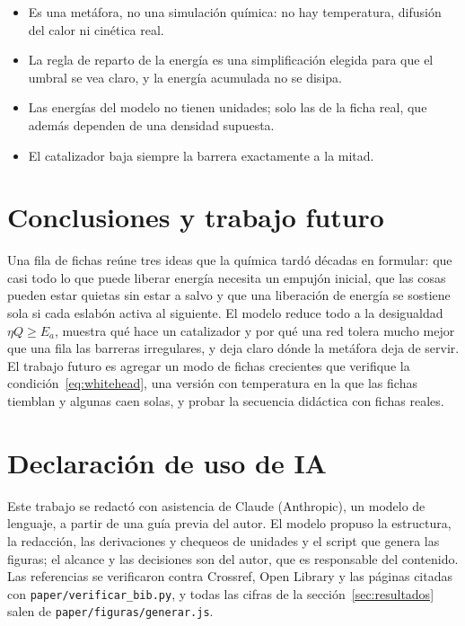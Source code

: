 \documentclass[11pt,a4paper]{article}
\begin{document}
\begin{itemize}
\item Es una metáfora, no una simulación química: no hay temperatura, difusión del calor ni cinética real.
\item La regla de reparto de la energía es una simplificación elegida para que el umbral se vea claro, y la energía acumulada no se disipa.
\item Las energías del modelo no tienen unidades; solo las de la ficha real, que además dependen de una densidad supuesta.
\item El catalizador baja siempre la barrera exactamente a la mitad.
\end{itemize}

\section{Conclusiones y trabajo futuro}\label{sec:conclusiones}

Una fila de fichas reúne tres ideas que la química tardó décadas en formular: que casi todo lo que puede liberar energía necesita un empujón inicial, que las cosas pueden estar quietas sin estar a salvo y que una liberación de energía se sostiene sola si cada eslabón activa al siguiente. El modelo reduce todo a la desigualdad $\eta Q \ge E_a$, muestra qué hace un catalizador y por qué una red tolera mucho mejor que una fila las barreras irregulares, y deja claro dónde la metáfora deja de servir. El trabajo futuro es agregar un modo de fichas crecientes que verifique la condición~\eqref{eq:whitehead}, una versión con temperatura en la que las fichas tiemblan y algunas caen solas, y probar la secuencia didáctica con fichas reales.

\section*{Declaración de uso de IA}

Este trabajo se redactó con asistencia de Claude (Anthropic), un modelo de lenguaje, a partir de una guía previa del autor. El modelo propuso la estructura, la redacción, las derivaciones y chequeos de unidades y el script que genera las figuras; el alcance y las decisiones son del autor, que es responsable del contenido. Las referencias se verificaron contra Crossref, Open Library y las páginas citadas con \texttt{paper/verificar\_bib.py}, y todas las cifras de la sección~\ref{sec:resultados} salen de \texttt{paper/figuras/generar.js}.

\printbibliography
\end{document}
